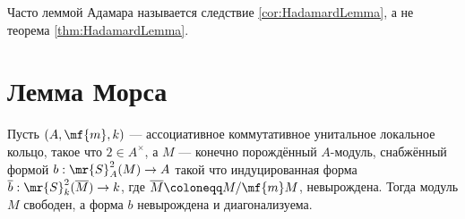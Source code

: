 \documentclass[
	extrafontsizes,
	11pt,
	hyphens,
]{memoir}
\begin{document}
\begin{remark}
Часто леммой Адамара называется следствие \ref{cor:HadamardLemma}, а не теорема \ref{thm:HadamardLemma}.
\end{remark}


\section{Лемма Морса}

%

\begin{theorem}
\label{thm:LocalRingQuad}
Пусть \((A,\mf{m},k)\) --- ассоциативное коммутативное унитальное локальное кольцо,
такое что \(2 \in A^\times\),
а \(M\) --- конечно порождённый \(A\)-модуль, снабжённый
формой \(b : \mr{S}^2_A(M) \to A\)
такой что индуцированная форма
\(\overline{b} : \mr{S}^2_k(\overline{M}) \to k\), где \(\overline{M} \coloneqq M/\mf{m}M\), невырождена.
Тогда модуль \(M\) свободен, а форма \(b\) невырождена и диагонализуема.
\end{theorem}
\end{document}
